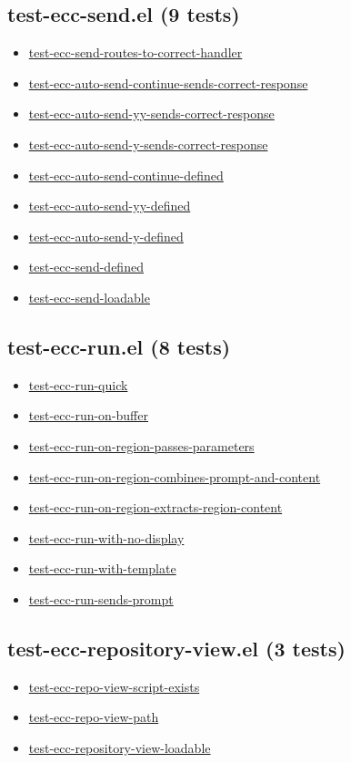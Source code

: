 \documentclass[11pt]{article}
\begin{document}
\subsection{test-ecc-send.el (9 tests)}
\label{sec:orgbd4ffb6}
\begin{itemize}
\item \href{test-ecc-send.el}{test-ecc-send-routes-to-correct-handler}
\item \href{test-ecc-send.el}{test-ecc-auto-send-continue-sends-correct-response}
\item \href{test-ecc-send.el}{test-ecc-auto-send-yy-sends-correct-response}
\item \href{test-ecc-send.el}{test-ecc-auto-send-y-sends-correct-response}
\item \href{test-ecc-send.el}{test-ecc-auto-send-continue-defined}
\item \href{test-ecc-send.el}{test-ecc-auto-send-yy-defined}
\item \href{test-ecc-send.el}{test-ecc-auto-send-y-defined}
\item \href{test-ecc-send.el}{test-ecc-send-defined}
\item \href{test-ecc-send.el}{test-ecc-send-loadable}
\end{itemize}
\subsection{test-ecc-run.el (8 tests)}
\label{sec:orgfefede4}
\begin{itemize}
\item \href{test-ecc-run.el}{test-ecc-run-quick}
\item \href{test-ecc-run.el}{test-ecc-run-on-buffer}
\item \href{test-ecc-run.el}{test-ecc-run-on-region-passes-parameters}
\item \href{test-ecc-run.el}{test-ecc-run-on-region-combines-prompt-and-content}
\item \href{test-ecc-run.el}{test-ecc-run-on-region-extracts-region-content}
\item \href{test-ecc-run.el}{test-ecc-run-with-no-display}
\item \href{test-ecc-run.el}{test-ecc-run-with-template}
\item \href{test-ecc-run.el}{test-ecc-run-sends-prompt}
\end{itemize}
\subsection{test-ecc-repository-view.el (3 tests)}
\label{sec:org92c2a64}
\begin{itemize}
\item \href{test-ecc-repository-view.el}{test-ecc-repo-view-script-exists}
\item \href{test-ecc-repository-view.el}{test-ecc-repo-view-path}
\item \href{test-ecc-repository-view.el}{test-ecc-repository-view-loadable}
\end{itemize}
\end{document}
